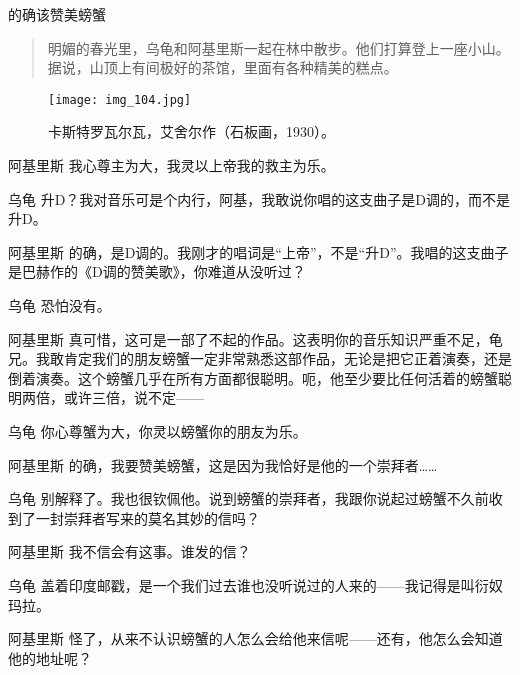

\begin{dialog}{的确该赞美螃蟹}

\begin{quote}
明媚的春光里，乌龟和阿基里斯一起在林中散步。他们打算登上一座小山。据说，山顶上有间极好的茶馆，里面有各种精美的糕点。
\end{quote}

\begin{figure}
\texttt{[image: img\_104.jpg]}
\caption[卡斯特罗瓦尔瓦，艾舍尔作。]
  {卡斯特罗瓦尔瓦，艾舍尔作（石板画，1930）。}
\end{figure}

\begin{dialogue}

\item[阿基里斯]我心尊主为大，我灵以上帝我的救主为乐。

\item[乌龟]升D？我对音乐可是个内行，阿基，我敢说你唱的这支曲子是D调的，而不是升D。

\item[阿基里斯]的确，是D调的。我刚才的唱词是“上帝”，不是“升D”。我唱的这支曲子是巴赫作的《D调的赞美歌》，你难道从没听过？

\item[乌龟]恐怕没有。

\item[阿基里斯]真可惜，这可是一部了不起的作品。这表明你的音乐知识严重不足，龟兄。我敢肯定我们的朋友螃蟹一定非常熟悉这部作品，无论是把它正着演奏，还是倒着演奏。这个螃蟹几乎在所有方面都很聪明。呃，他至少要比任何活着的螃蟹聪明两倍，或许三倍，说不定——

\item[乌龟]你心尊蟹为大，你灵以螃蟹你的朋友为乐。

\item[阿基里斯]的确，我要赞美螃蟹，这是因为我恰好是他的一个崇拜者……

\item[乌龟]别解释了。我也很钦佩他。说到螃蟹的崇拜者，我跟你说起过螃蟹不久前收到了一封崇拜者写来的莫名其妙的信吗？

\item[阿基里斯]我不信会有这事。谁发的信？

\item[乌龟]盖着印度邮戳，是一个我们过去谁也没听说过的人来的——我记得是叫衍奴玛拉。

\item[阿基里斯]怪了，从来不认识螃蟹的人怎么会给他来信呢——还有，他怎么会知道他的地址呢？


\end{dialogue}
\end{dialog}

